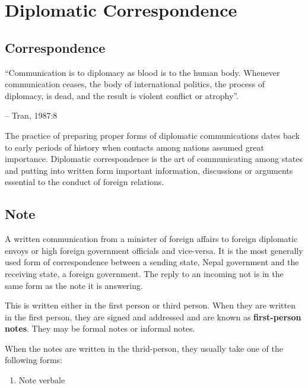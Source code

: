\documentclass[
  openany]{book}
\providecommand{\tightlist}{%
  \setlength{\itemsep}{0pt}\setlength{\parskip}{0pt}}
\begin{document}
\hypertarget{diplomatic-correspondence}{%
\chapter{Diplomatic Correspondence}\label{diplomatic-correspondence}}

\hypertarget{correspondence}{%
\section{Correspondence}\label{correspondence}}

``Communication is to diplomacy as blood is to the human body. Whenever communication ceases, the body of international politics, the process of diplomacy, is dead, and the result is violent conflict or atrophy''.

-- Tran, 1987:8

The practice of preparing proper forms of diplomatic communications dates back to early periods of history when contacts among nations assumed great importance. Diplomatic correspondence is the art of communicating among states and putting into written form important information, discussions or arguments essential to the conduct of foreign relations.

\hypertarget{note}{%
\section{Note}\label{note}}

A written communication from a minister of foreign affairs to foreign diplomatic envoys or high foreign government officials and vice-versa. It is the most generally used form of correspondence between a sending state, Nepal government and the receiving state, a foreign government. The reply to an incoming not is in the same form as the note it is answering.

This is written either in the first person or third person. When they are written in the first person, they are signed and addressed and are known as \textbf{first-person notes}. They may be formal notes or informal notes.

When the notes are written in the thrid-person, they usually take one of the following forms:

\begin{enumerate}
\def\labelenumi{\arabic{enumi}.}
\tightlist
\item
  Note verbale
\end{enumerate}
\end{document}
